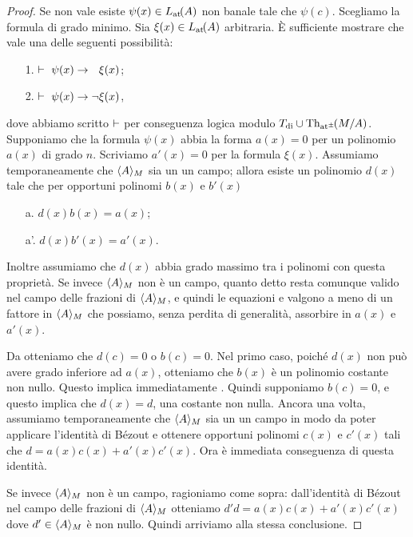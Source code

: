 \begin{proof}
Se  non vale esiste $\psi(x)\in L_{\tiny\rm at}\hskip-.3ex(A)$ non banale tale che $\psi(c)$. Scegliamo la formula di grado minimo. Sia $\xi(x)\in L_{\tiny\rm at}\hskip-.3ex(A)$ arbitraria. \`E sufficiente mostrare che vale una delle seguenti possibilit\`a:
\begin{itemize}
\item[1.] $\proves\ \psi(x)\imp\phantom{\neg}\xi(x)$;
\item[2.] $\vdash\ \psi(x)\rightarrow\neg\xi(x)$,
\end{itemize} 
dove abbiamo scritto $\vdash$ per conseguenza logica modulo $T_{\rm di}\cup\textrm{Th}_{{\tiny\rm at^\pm}}\hskip-.3ex(M/A)$. Supponiamo che la formula $\psi(x)$ abbia la forma $a(x)=0$ per un polinomio $a(x)$ di grado $n$. Scriviamo $a'(x)=0$ per la formula $\xi(x)$.  Assumiamo temporaneamente che $\langle A\rangle_M$ sia un un campo; allora esiste un polinomio $d(x)$ tale che per opportuni polinomi $b(x)$ e $b'(x)$
\begin{itemize}
\item[a.] $d(x)b(x)=a(x)$;
\item[a'.] $d(x)b'(x)=a'(x)$.
\end{itemize}   
Inoltre assumiamo che $d(x)$ abbia grado massimo tra i polinomi con questa propriet\`a. Se invece $\langle A\rangle_M$ non \`e un campo, quanto detto resta comunque valido nel campo delle frazioni di $\langle A\rangle_M$, e quindi le equazioni  e  valgono a meno di un fattore in $\langle A\rangle_M$ che possiamo, senza perdita di generalit\`a, assorbire in $a(x)$ e $a'(x)$. 

Da  otteniamo che $d(c)=0$ o $b(c)=0$. Nel primo caso, poich\'e $d(x)$ non pu\`o avere grado inferiore ad $a(x)$, otteniamo che $b(x)$ \`e un polinomio costante non nullo.  Questo implica immediatamente . Quindi supponiamo $b(c)=0$, e questo implica che $d(x)=d$, una costante non nulla. Ancora una volta, assumiamo temporaneamente che $\langle A\rangle_M$ sia un un campo in modo da poter applicare l'identit\`a di B\'ezout e ottenere opportuni polinomi $c(x)$ e $c'(x)$ tali che $d=a(x)c(x)+a'(x)c'(x)$. Ora  \`e immediata conseguenza di questa identit\`a. 

Se invece $\langle A\rangle_M$ non \`e un campo, ragioniamo come sopra: dall'identit\`a di B\'ezout nel campo delle frazioni di $\langle A\rangle_M$ otteniamo $d'd=a(x)c(x)+a'(x)c'(x)$ dove $d'\in\langle A\rangle_M$ \`e non nullo. Quindi arriviamo  alla stessa conclusione.
\end{proof}



